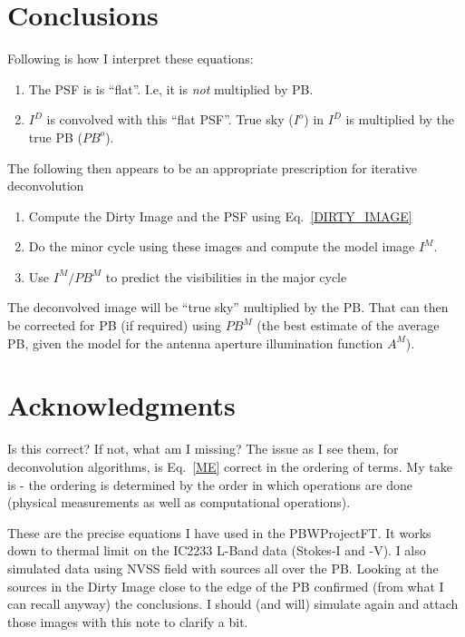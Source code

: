 \documentclass[11pt,epsf]{article}
\begin{document}
\section{Conclusions}
Following is how I interpret these equations:
\begin{enumerate}
\item The PSF is is ``flat''.  I.e, it is {\it not} multiplied by PB.
\item $I^D$ is convolved with this ``flat PSF''.  True sky ($I^o$) in $I^D$
  is multiplied by the true PB ($PB^o$).  
\end{enumerate}
The following then appears to be an appropriate prescription for
iterative deconvolution
\begin{enumerate}
\item Compute the Dirty Image and the PSF using Eq.~\ref{DIRTY_IMAGE}
\item Do the minor cycle using these images and compute the model
  image $I^M$.
\item Use $I^M/PB^M$ to predict the visibilities in the major cycle
\end{enumerate}

The deconvolved image will be ``true sky'' multiplied by the PB.  That
can then be corrected for PB (if required) using $PB^M$ (the best
estimate of the average PB, given the model for the antenna aperture
illumination function $A^M$).

\section{Acknowledgments}
Is this correct?  If not, what am I missing?  The issue as I see them,
for deconvolution algorithms, is Eq.~\ref{ME} correct in the ordering
of terms.  My take is - the ordering is determined by the order in
which operations are done (physical measurements as well as
computational operations).

These are the precise equations I have used in the PBWProjectFT.  It
works down to thermal limit on the IC2233 L-Band data (Stokes-I and
-V).  I also simulated data using NVSS field with sources all over the
PB.  Looking at the sources in the Dirty Image close to the edge of
the PB confirmed (from what I can recall anyway) the conclusions.  I
should (and will) simulate again and attach those images with this note
to clarify a bit.
\end{document}
